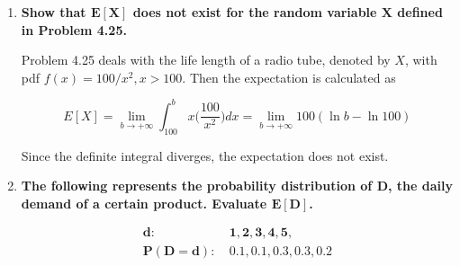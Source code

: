 \documentclass[10pt, oneside]{article}
\begin{document}
\begin{enumerate}[label=7.\arabic*]
\begin{enumerate}
	Problem 4.18 describes the life length of an electronic device, represented by $X$, which has pdf $f(x) = k / x^n$ over $2000 \leq x \leq 10000$. In the general case,
	
	\[ k = \frac{(n-1) 2^{n-1} \cdot 10^{4(n-1)}}{10^{n-1} - 2^{n-1}} \]
	
	as derived in the solutions set for chapter 4. In the case of continuous variables, we calculate the expectation as follows:
	
	\begin{align*}
	E[X] = \int^{10000}_{2000} x f(x) dx &= \int^{10000}_{2000} kx^{-(n-1)} dx \\
	&= \boxed{ \frac{k}{n-2} (2000^{-(n-2)} - 10000^{-(n-2)})  }
	\end{align*}
	
	Upon inspection, it is apparent that this equation does not work in the case of $n = 2$. Here we can simply calculate
	
	\[ E[X] = \int^{10000}_{2000} kx^{-1} \ dx = 2500 \ln 5 \approx \boxed{4023.6} \]
	
	\end{enumerate}
	
\item  \begin{tcolorbox}[
  colback=Cerulean!5!white,
  colframe=Cerulean!75!black]
\textbf{Show that $\bm{E[X]}$ does not exist for the random variable $\bm{X}$ defined in Problem 4.25.}
\end{tcolorbox}

Problem 4.25 deals with the life length of a radio tube, denoted by $X$, with pdf $f(x) = 100/x^2, x > 100$. Then the expectation is calculated as

\[ E[X] = \lim_{b \rightarrow +\infty} \int^b_{100} x \Big( \frac{100}{x^2} \Big) dx =  \lim_{b \rightarrow + \infty} 100 (\ln b - \ln 100)\] 

Since the definite integral diverges, the expectation does not exist.

\item  \begin{tcolorbox}[
  colback=Cerulean!5!white,
  colframe=Cerulean!75!black]
\textbf{The following represents the probability distribution of $\bm{D}$, the daily demand of a certain product. Evaluate $\bm{E[D]}$.}

\begin{align*}
\bm{d:}& \ \bm{1, 2, 3, 4, 5,} \\
\bm{P(D = d):}& \ \bm{0.1, 0.1, 0.3, 0.3, 0.2}
\end{align*}
\end{tcolorbox}


\end{enumerate}
\end{document}
